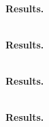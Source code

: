 
\begin{description}[leftmargin=1cm, itemsep=3pt]
  \item[RQ1)] \textbf{\rqone}\\
  \textbf{Results.} \fdone


  
  \item[RQ2)] \textbf{\rqtwo}\\
  \textbf{Results.} \fdtwo

  
  \item[RQ3)] \textbf{\rqthree}\\
  \textbf{Results.} \fdthree
  
  \item[RQ4)] \textbf{\rqfour}\\
  \textbf{Results.} \fdfour
\end{description}


